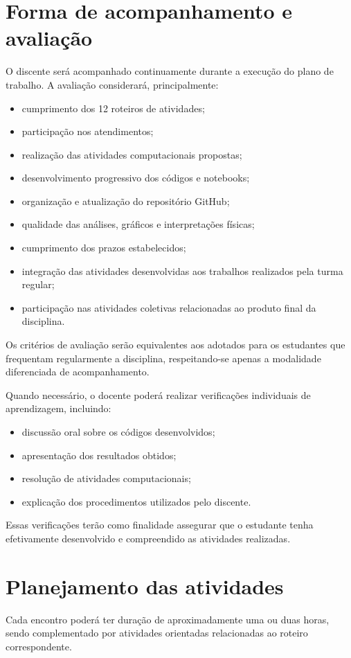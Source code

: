 \documentclass[11pt,a4paper]{article}
\begin{document}
\section{Forma de acompanhamento e avaliação}
O discente será acompanhado continuamente durante a execução do plano de trabalho. A avaliação considerará, principalmente:
\begin{itemize}
    \item cumprimento dos 12 roteiros de atividades;
    \item participação nos atendimentos;
    \item realização das atividades computacionais propostas;
    \item desenvolvimento progressivo dos códigos e notebooks;
    \item organização e atualização do repositório GitHub;
    \item qualidade das análises, gráficos e interpretações físicas;
    \item cumprimento dos prazos estabelecidos;
    \item integração das atividades desenvolvidas aos trabalhos realizados pela turma regular;
    \item participação nas atividades coletivas relacionadas ao produto final da disciplina.
\end{itemize}

Os critérios de avaliação serão equivalentes aos adotados para os estudantes que frequentam regularmente a disciplina, respeitando-se apenas a modalidade diferenciada de acompanhamento.

Quando necessário, o docente poderá realizar verificações individuais de aprendizagem, incluindo:
\begin{itemize}
    \item discussão oral sobre os códigos desenvolvidos;
    \item apresentação dos resultados obtidos;
    \item resolução de atividades computacionais;
    \item explicação dos procedimentos utilizados pelo discente.
\end{itemize}
Essas verificações terão como finalidade assegurar que o estudante tenha efetivamente desenvolvido e compreendido as atividades realizadas.

\section{Planejamento das atividades}
Cada encontro poderá ter duração de aproximadamente uma ou duas horas, sendo complementado por atividades orientadas relacionadas ao roteiro correspondente.
\end{document}
